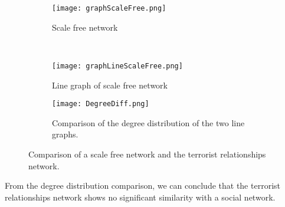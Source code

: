 \begin{figure}[H]
\begin{center}
    \begin{subfigure}[b]{0.45\textwidth}
        \texttt{[image: graphScaleFree.png]}
        \caption{Scale free network}
        \label{fig:Scalefree}
    \end{subfigure}
    ~
    \begin{subfigure}[b]{0.45\textwidth}
        \texttt{[image: graphLineScaleFree.png]}
        \caption{Line graph of scale free network}
        \label{fig:lineG}
    \end{subfigure}
    
    \begin{subfigure}[b]{\textwidth}
    	\begin{centering}
        \texttt{[image: DegreeDiff.png]}
        \caption{\centering Comparison of the degree distribution of the two line graphs.}
        \label{fig:DegDiff}
        \end{centering}
    \end{subfigure}
\caption{Comparison of a scale free network and the terrorist relationships network.}
\label{fig:RelationshipScaleFree}
\end{center}
\end{figure}

From the degree distribution comparison, we can conclude that the terrorist relationships network shows no significant similarity with a  social network. 
%
